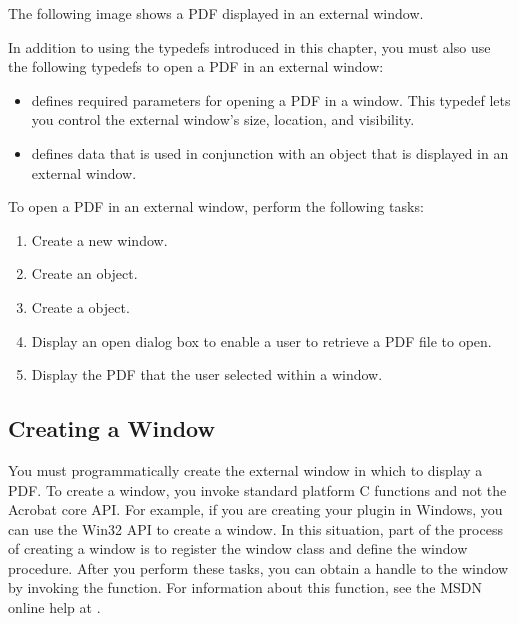 \documentclass[letterpaper,12pt,english,openany,oneside]{sphinxmanual}
\begin{document}
The following image shows a PDF displayed in an external window.

\noindent{}

In addition to using the typedefs introduced in this chapter, you must also use the following typedefs to open a PDF in an external window:
\begin{itemize}
\item {} 
 \sphinxhyphen{} defines required parameters for opening a PDF in a window. This typedef lets you control the external window’s size, location, and visibility.

\item {} 
 \sphinxhyphen{} defines data that is used in conjunction with an  object that is displayed in an external window.

\end{itemize}

To open a PDF in an external window, perform the following tasks:
\begin{enumerate}
%
\item {} 
Create a new window.

\item {} 
Create an  object.

\item {} 
Create a  object.

\item {} 
Display an open dialog box to enable a user to retrieve a PDF file to open.

\item {} 
Display the PDF that the user selected within a window.

\end{enumerate}


\subsection{Creating a Window}
\label{\detokenize{Plugins_Documents:creating-a-window}}
You must programmatic\sphinxhyphen{}ally create the external window in which to display a PDF. To create a window, you invoke standard platform C functions and not the Acrobat core API. For example, if you are creating your plugin in Windows, you can use the Win32 API to create a window. In this situation, part of the process of creating a window is to register the window class and define the window procedure. After you perform these tasks, you can obtain a handle to the window by invoking the  function. For information about this function, see the MSDN online help at .
\end{document}
